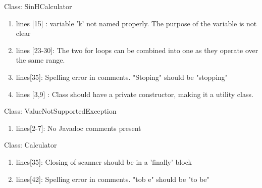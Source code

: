 Class: SinHCalculator
\begin{enumerate}
    \item lines [15] : variable 'k' not named properly. The purpose of the variable is not clear
    \item lines [23-30]: The two for loops can be combined into one as they operate over the same range. 
    \item lines[35]: Spelling error in comments. "Stoping" should be "stopping"
    \item lines [3,9] : Class should have a private constructor, making it a utility class.
\end{enumerate}
Class: ValueNotSupportedException
\begin{enumerate}
    \item lines[2-7]: No Javadoc comments present
\end{enumerate}
Class: Calculator
\begin{enumerate}
    \item lines[35]: Closing of scanner should be in a 'finally' block
    \item lines[42]: Spelling error in comments. "tob e" should be "to be"
\end{enumerate}
